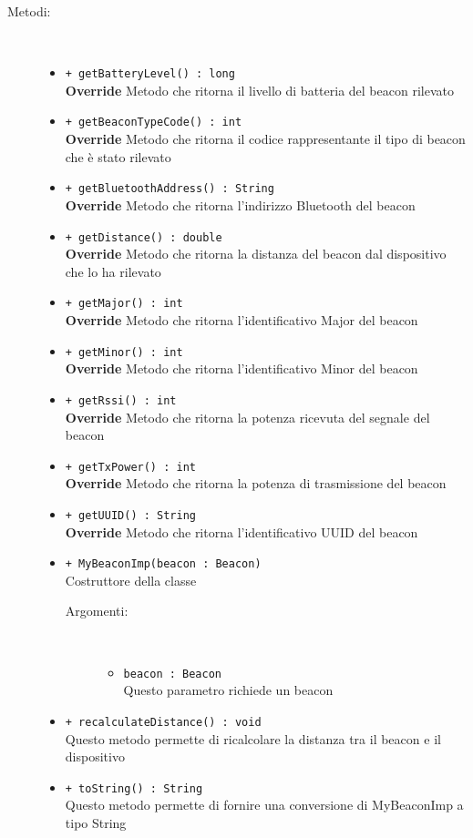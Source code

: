 \documentclass[../DefinizioneDiProdotto.tex]{subfiles}
\begin{document}
\begin{description}
\begin{itemize}
\end{itemize}
\item[Metodi:] \
\begin{itemize}
\item \texttt{+ getBatteryLevel() : long}\\
\textbf{Override} Metodo che ritorna il livello di batteria del beacon rilevato
 \item \texttt{+ getBeaconTypeCode() : int}\\
\textbf{Override} Metodo che ritorna il codice rappresentante il tipo di beacon che è stato rilevato
 \item \texttt{+ getBluetoothAddress() : String}\\
\textbf{Override} Metodo che ritorna l'indirizzo Bluetooth del beacon
 \item \texttt{+ getDistance() : double}\\
\textbf{Override} Metodo che ritorna la distanza del beacon dal dispositivo che lo ha rilevato
 \item \texttt{+ getMajor() : int}\\
\textbf{Override} Metodo che ritorna l'identificativo Major del beacon
 \item \texttt{+ getMinor() : int}\\
\textbf{Override} Metodo che ritorna l'identificativo Minor del beacon
 \item \texttt{+ getRssi() : int}\\
\textbf{Override} Metodo che ritorna la potenza ricevuta del segnale del beacon
 \item \texttt{+ getTxPower() : int}\\
\textbf{Override} Metodo che ritorna la potenza di trasmissione del beacon
 \item \texttt{+ getUUID() : String}\\
\textbf{Override} Metodo che ritorna l'identificativo UUID del beacon
 \item \texttt{+ MyBeaconImp(beacon : Beacon)}\\
Costruttore della classe
 \begin{description}
\item[Argomenti:] \
\begin{itemize}
\item \texttt{beacon : Beacon}\\
Questo parametro richiede un beacon\end{itemize}
\end{description}
\item \texttt{+ recalculateDistance() : void}\\
Questo metodo permette di ricalcolare la distanza tra il beacon e il dispositivo
 \item \texttt{+ toString() : String}\\
Questo metodo permette di fornire una conversione di MyBeaconImp a tipo String
 \end{itemize}
\end{description}
\end{document}

